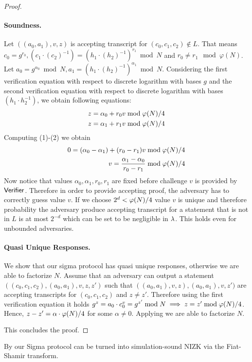 \begin{proof}
\paragraph{Soundness.} Let $((a_0, a_1), v, z)$ is accepting transcript for $(c_0, c_1, c_2) \notin L$. That means $c_0 = g^{r_0}, (c_1\cdot (c_2)^{-1}) = (h_1\cdot (h_2)^{-1})^{r_1} \bmod N$ and $r_0 \neq r_1 \mod \varphi(N)$. Let $a_0 = g^{\alpha_0} \bmod N, a_1 = (h_1\cdot (h_2)^{-1})^{\alpha_1} \bmod N$. Considering the first verification equation with respect to discrete logarithm with bases $g$ and the second verification equation with respect to discrete logarithm with bases $(h_1 \cdot h_2^{-1})$, we obtain following equations:
\begin{align}
z = \alpha_0 + r_0 v \bmod \varphi(N)/4\\
z = \alpha_1 + r_1 v \bmod \varphi(N)/4
\end{align}
Computing (1)-(2) we obtain
\begin{align*}
0 = (\alpha_0 - \alpha_1)+ (r_0-r_1)v \bmod \varphi(N)/4 \\
v = \frac{\alpha_1 - \alpha_0}{r_0-r_1} \bmod \varphi(N)/4
\end{align*}
Now notice that values $\alpha_0, \alpha_1, r_0, r_1$ are fixed before challenge $v$ is provided by $\mathsf{Verifier}$. Therefore in order to provide accepting proof, the adversary has to correctly guess value $v$. If we choose $2^d < \varphi(N)/4$ value $v$ is unique and therefore probability the adversary produce accepting transcript for a statement that is not in $L$ is at most $2^{-d}$ which can be set to be negligible in $\lambda$. This holds even for unbounded adversaries. 



\paragraph{Quasi Unique Responses.} We show that our sigma protocol has quasi unique responses, otherwise we are able to factorize $N$. Assume that an adversary can output a statement $((c_0, c_1, c_2), (a_0, a_1), v, z, z')$ such that $((a_0, a_1), v, z), (a_0, a_1), v, z')$ are accepting transcripts for $(c_0, c_1, c_2)$ and $z \neq z'$. Therefore using the first verification equation it holds $g^z = a_0 \cdot c_0^v = g^{z'} \bmod N \implies z = z' \bmod \varphi(N)/4$. Hence, $z-z' = \alpha \cdot \varphi(N)/4$ for some $\alpha \neq 0$. Applying  we are able to factorize $N$.

This concludes the proof.
\end{proof}

By  our Sigma protocol can be turned into simulation-sound NIZK via the Fiat-Shamir transform. 




